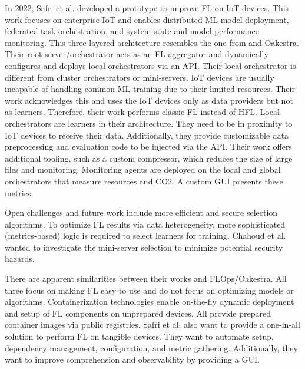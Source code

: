 In 2022, Safri et al. \cite{paper:global_fl_platform_for_iot} developed a prototype to improve FL on IoT devices.
This work focuses on enterprise IoT and enables distributed ML model deployment, federated task orchestration, and system state and model performance monitoring.
This three-layered architecture resembles the one from \cite{paper:fl_toward_on_demand_client_deployment_at_edge} and Oakestra.
Their root server/orchestrator acts as an FL aggregator and dynamically configures and deploys local orchestrators via an API.
Their local orchestrator is different from cluster orchestrators or mini-servers.
IoT devices are usually incapable of handling common ML training due to their limited resources.
Their work acknowledges this and uses the IoT devices only as data providers but not as learners.
Therefore, their work performs classic FL instead of HFL.
Local orchestrators are learners in their architecture.
They need to be in proximity to IoT devices to receive their data.
Additionally, they provide customizable data preprocessing and evaluation code to be injected via the API.
Their work offers additional tooling, such as a custom compressor, which reduces the size of large files and monitoring.
Monitoring agents are deployed on the local and global orchestrators that measure resources and CO2.
A custom GUI presents these metrics.

Open challenges and future work include more efficient and secure selection algorithms.
To optimize FL results via data heterogeneity, more sophisticated (metrics-based) logic is required to select learners for training.
Chahoud et al. wanted to investigate the mini-server selection to minimize potential security hazards.

There are apparent similarities between their works and FLOps/Oakestra.
All three focus on making FL easy to use and do not focus on optimizing models or algorithms.
Containerization technologies enable on-the-fly dynamic deployment and setup of FL components on unprepared devices.
All provide prepared container images via public registries.
Safri et al. also want to provide a one-in-all solution to perform FL on tangible devices.
They want to automate setup, dependency management, configuration, and metric gathering.
Additionally, they want to improve comprehension and observability by providing a GUI.

